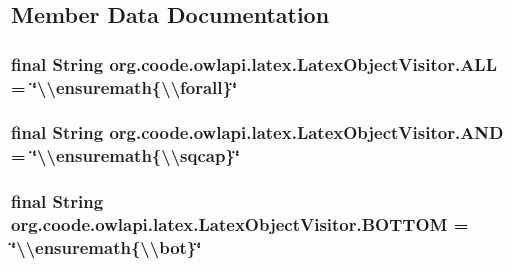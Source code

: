 \subsection{Member Data Documentation}
\hypertarget{classorg_1_1coode_1_1owlapi_1_1latex_1_1_latex_object_visitor_aacbf85b86083d87fc52694c207237652}{
\subsubsection[{A\-L\-L}]{\setlength{\rightskip}{0pt plus 5cm}final String org.\-coode.\-owlapi.\-latex.\-Latex\-Object\-Visitor.\-A\-L\-L = \char`\"{}\textbackslash{}\textbackslash{}ensuremath\{\textbackslash{}\textbackslash{}forall\}\char`\"{}\hspace{0.3cm}{\ttfamily [static]}}}\label{classorg_1_1coode_1_1owlapi_1_1latex_1_1_latex_object_visitor_aacbf85b86083d87fc52694c207237652}
\hypertarget{classorg_1_1coode_1_1owlapi_1_1latex_1_1_latex_object_visitor_a10b0eb0b9cac207068ca8e4c3b94d246}{
\subsubsection[{A\-N\-D}]{\setlength{\rightskip}{0pt plus 5cm}final String org.\-coode.\-owlapi.\-latex.\-Latex\-Object\-Visitor.\-A\-N\-D = \char`\"{}\textbackslash{}\textbackslash{}ensuremath\{\textbackslash{}\textbackslash{}sqcap\}\char`\"{}\hspace{0.3cm}{\ttfamily [static]}}}\label{classorg_1_1coode_1_1owlapi_1_1latex_1_1_latex_object_visitor_a10b0eb0b9cac207068ca8e4c3b94d246}
\hypertarget{classorg_1_1coode_1_1owlapi_1_1latex_1_1_latex_object_visitor_a719627cd027c5ce68196809671d754b8}{
\subsubsection[{B\-O\-T\-T\-O\-M}]{\setlength{\rightskip}{0pt plus 5cm}final String org.\-coode.\-owlapi.\-latex.\-Latex\-Object\-Visitor.\-B\-O\-T\-T\-O\-M = \char`\"{}\textbackslash{}\textbackslash{}ensuremath\{\textbackslash{}\textbackslash{}bot\}\char`\"{}\hspace{0.3cm}{\ttfamily [static]}}}\label{classorg_1_1coode_1_1owlapi_1_1latex_1_1_latex_object_visitor_a719627cd027c5ce68196809671d754b8}
